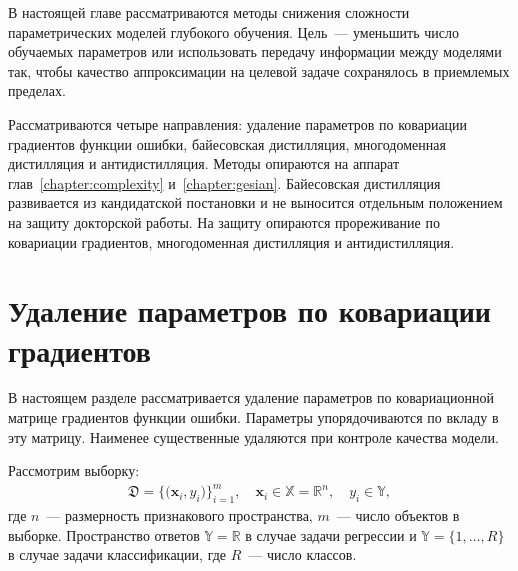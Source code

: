 В настоящей главе рассматриваются методы снижения сложности параметрических моделей глубокого обучения. Цель~--- уменьшить число обучаемых параметров или использовать передачу информации между моделями так, чтобы качество аппроксимации на целевой задаче сохранялось в приемлемых пределах.

Рассматриваются четыре направления: удаление параметров по ковариации градиентов функции ошибки, байесовская дистилляция, многодоменная дистилляция и антидистилляция. Методы опираются на аппарат глав~\ref{chapter:complexity} и~\ref{chapter:gesian}. Байесовская дистилляция развивается из кандидатской постановки и не выносится отдельным положением на защиту докторской работы. На защиту опираются прореживание по ковариации градиентов, многодоменная дистилляция и антидистилляция.

\section{Удаление параметров по ковариации градиентов}

В настоящем разделе рассматривается удаление параметров по ковариационной матрице градиентов функции ошибки. Параметры упорядочиваются по вкладу в эту матрицу. Наименее существенные удаляются при контроле качества модели.

Рассмотрим выборку:
\[
    \label{ch-5:eq:st:1}
    \begin{aligned}
    \mathfrak{D} = \bigl\{\bigl(\textbf{x}_i, y_i\bigr)\bigr\}_{i=1}^{m}, \quad \textbf{x}_{i} \in \mathbb{X} = \mathbb{R}^{n}, \quad y_i \in \mathbb{Y},
    \end{aligned}
\]
где $n$~--- размерность признакового пространства, $m$~--- число объектов в выборке. Пространство ответов $\mathbb{Y} = \mathbb{R}$ в случае задачи регрессии и  $\mathbb{Y} = \{1,\ldots, R\}$ в случае задачи классификации, где $R$~--- число классов.

